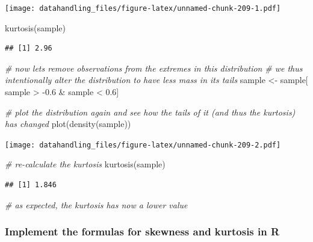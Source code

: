 \documentclass[
  12pt,
]{style/krantz}
\newenvironment{Shaded}{\begin{snugshade}}{\end{snugshade}}
\newcommand{\CommentTok}[1]{\textcolor[rgb]{0.56,0.35,0.01}{\textit{#1}}}
\newcommand{\FloatTok}[1]{\textcolor[rgb]{0.00,0.00,0.81}{#1}}
\newcommand{\FunctionTok}[1]{\textcolor[rgb]{0.00,0.00,0.00}{#1}}
\newcommand{\NormalTok}[1]{#1}
\newcommand{\OtherTok}[1]{\textcolor[rgb]{0.56,0.35,0.01}{#1}}
\newcommand{\SpecialCharTok}[1]{\textcolor[rgb]{0.00,0.00,0.00}{#1}}
\begin{document}
\texttt{[image: datahandling\_files/figure-latex/unnamed-chunk-209-1.pdf]}

\begin{Shaded}
\begin{Highlighting}[]
\FunctionTok{kurtosis}\NormalTok{(sample)}
\end{Highlighting}
\end{Shaded}

\begin{verbatim}
## [1] 2.96
\end{verbatim}

\begin{Shaded}
\begin{Highlighting}[]
\CommentTok{\# now lets remove observations from the extremes in this distribution}
\CommentTok{\# we thus intentionally alter the distribution to have less mass in its tails}
\NormalTok{sample }\OtherTok{\textless{}{-}}\NormalTok{ sample[ sample }\SpecialCharTok{\textgreater{}} \SpecialCharTok{{-}}\FloatTok{0.6} \SpecialCharTok{\&}\NormalTok{ sample }\SpecialCharTok{\textless{}} \FloatTok{0.6}\NormalTok{]}

\CommentTok{\# plot the distribution again and see how the tails of it (and thus the kurtosis) has changed}
\FunctionTok{plot}\NormalTok{(}\FunctionTok{density}\NormalTok{(sample))}
\end{Highlighting}
\end{Shaded}

\texttt{[image: datahandling\_files/figure-latex/unnamed-chunk-209-2.pdf]}

\begin{Shaded}
\begin{Highlighting}[]
\CommentTok{\# re{-}calculate the kurtosis}
\FunctionTok{kurtosis}\NormalTok{(sample)}
\end{Highlighting}
\end{Shaded}

\begin{verbatim}
## [1] 1.846
\end{verbatim}

\begin{Shaded}
\begin{Highlighting}[]
\CommentTok{\# as expected, the kurtosis has now a lower value}
\end{Highlighting}
\end{Shaded}

\hypertarget{implement-the-formulas-for-skewness-and-kurtosis-in-r}{%
\subsubsection{Implement the formulas for skewness and kurtosis in R}\label{implement-the-formulas-for-skewness-and-kurtosis-in-r}}
\end{document}

